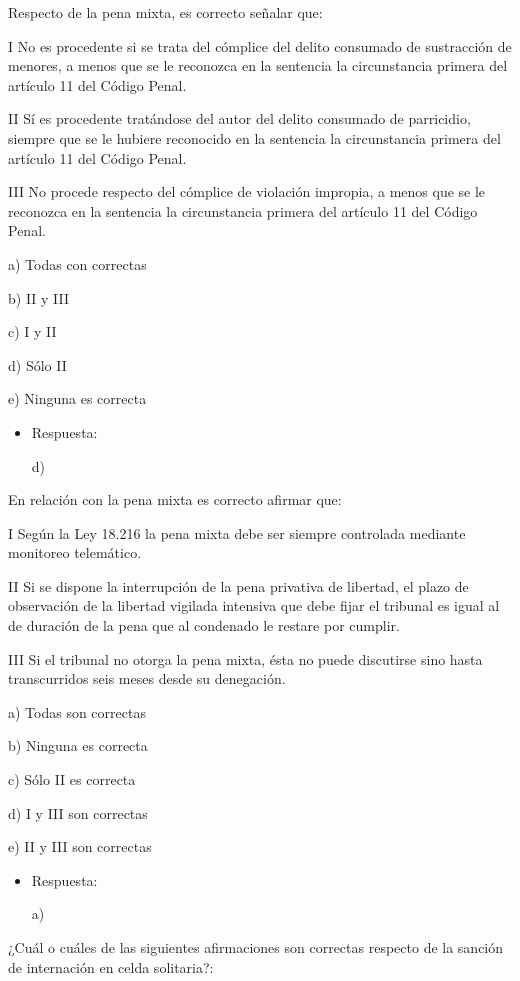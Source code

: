 \documentclass[letterpaper, 11pt]{article}
\begin{document}
Respecto de la pena mixta, es correcto señalar que:


I No es procedente si se trata del cómplice del delito consumado de
sustracción de menores, a menos que se le reconozca en la sentencia la
circunstancia primera del artículo 11 del Código Penal.

II Sí es procedente tratándose del autor del delito consumado de
parricidio, siempre que se le hubiere reconocido en la sentencia la
circunstancia primera del artículo 11 del Código Penal.

III No procede respecto del cómplice de violación impropia, a menos
que se le reconozca en la sentencia la circunstancia primera del
artículo 11 del Código Penal.

a) Todas con correctas

b) II y III

c) I y II

d) Sólo II

e) Ninguna es correcta

\begin{itemize}
\item Respuesta:

d)
\end{itemize}


En relación con la pena mixta es correcto afirmar que:


I Según la Ley 18.216 la pena mixta debe ser siempre controlada
mediante monitoreo telemático.


II Si se dispone la interrupción de la pena privativa de libertad, el
plazo de observación de la libertad vigilada intensiva que debe fijar
el tribunal es igual al de duración de la pena que al condenado le
restare por cumplir.

III Si el tribunal no otorga la pena mixta, ésta no puede discutirse
sino hasta transcurridos seis meses desde su denegación.

a) Todas son correctas

b) Ninguna es correcta

c) Sólo II es correcta

d) I y III son correctas

e) II y III son correctas

\begin{itemize}
\item Respuesta:

a)
\end{itemize}


¿Cuál o cuáles de las siguientes afirmaciones son correctas respecto
de la sanción de internación en celda solitaria?:
\end{document}
